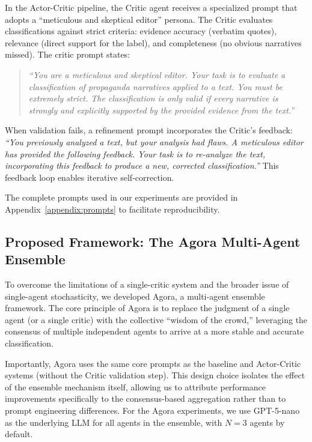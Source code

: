 In the Actor-Critic pipeline, the Critic agent receives a specialized prompt that adopts a ``meticulous and skeptical editor'' persona. The Critic evaluates classifications against strict criteria: evidence accuracy (verbatim quotes), relevance (direct support for the label), and completeness (no obvious narratives missed). The critic prompt states:

\begin{quote}
\textit{``You are a meticulous and skeptical editor. Your task is to evaluate a classification of propaganda narratives applied to a text. You must be extremely strict. The classification is only valid if every narrative is strongly and explicitly supported by the provided evidence from the text.''}
\end{quote}

\noindent When validation fails, a refinement prompt incorporates the Critic's feedback: \textit{``You previously analyzed a text, but your analysis had flaws. A meticulous editor has provided the following feedback. Your task is to re-analyze the text, incorporating this feedback to produce a new, corrected classification.''} This feedback loop enables iterative self-correction.

The complete prompts used in our experiments are provided in Appendix~\ref{appendix:prompts} to facilitate reproducibility.

\subsection{Proposed Framework: The Agora Multi-Agent Ensemble}

To overcome the limitations of a single-critic system and the broader issue of single-agent stochasticity, we developed Agora, a multi-agent ensemble framework. The core principle of Agora is to replace the judgment of a single agent (or a single critic) with the collective ``wisdom of the crowd,'' leveraging the consensus of multiple independent agents to arrive at a more stable and accurate classification.

Importantly, Agora uses the same core prompts as the baseline and Actor-Critic systems (without the Critic validation step). This design choice isolates the effect of the ensemble mechanism itself, allowing us to attribute performance improvements specifically to the consensus-based aggregation rather than to prompt engineering differences. For the Agora experiments, we use GPT-5-nano as the underlying LLM for all agents in the ensemble, with $N=3$ agents by default.

